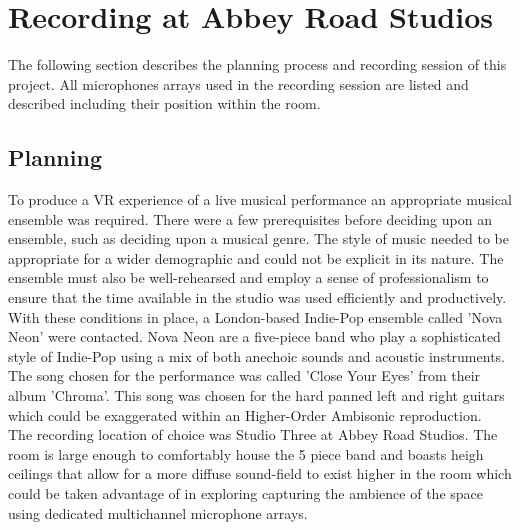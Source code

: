 
















\section{Recording at Abbey Road Studios}

	The following section describes the planning process and recording session of this project. All microphones arrays used in the recording session are listed and described including their position within the room. 

	\subsection{Planning}
		To produce a VR experience of a live musical performance an appropriate musical ensemble was required. There were a few prerequisites before deciding upon an ensemble, such as deciding upon a musical genre. The style of music needed to be appropriate for a wider demographic and could not be explicit in its nature. The ensemble must also be well-rehearsed and employ a sense of professionalism to ensure that the time available in the studio was used efficiently and productively. With these conditions in place, a London-based Indie-Pop ensemble called 'Nova Neon' were contacted. Nova Neon are a five-piece band who play a sophisticated style of Indie-Pop using a mix of both anechoic sounds and acoustic instruments. The song chosen for the performance was called 'Close Your Eyes' from their album 'Chroma'. This song was chosen for the hard panned left and right guitars which could be exaggerated within an Higher-Order Ambisonic reproduction. \\


		The recording location of choice was Studio Three at Abbey Road Studios. The room is large enough to comfortably house the 5 piece band and boasts heigh ceilings that allow for a more diffuse sound-field to exist higher in the room which could be taken advantage of in exploring capturing the ambience of the space using dedicated multichannel microphone arrays.\\


